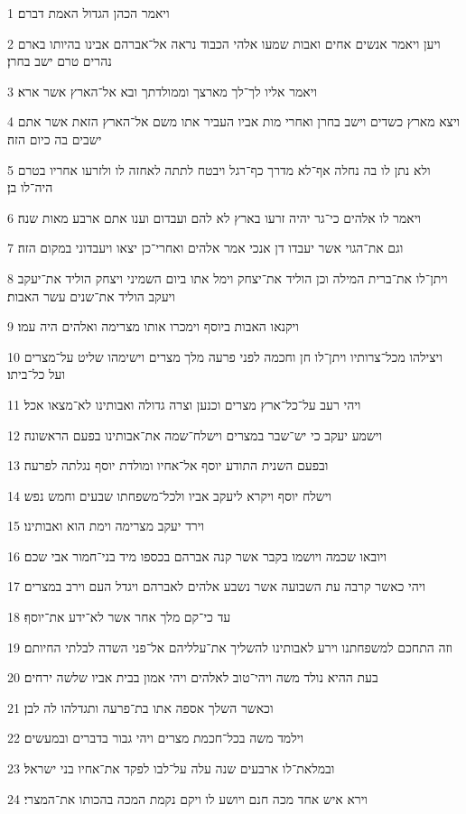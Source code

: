 \par 1 ויאמר הכהן הגדול האמת דברם׃
\par 2 ויען ויאמר אנשים אחים ואבות שמעו אלהי הכבוד נראה אל־אברהם אבינו בהיותו בארם נהרים טרם ישב בחרן׃
\par 3 ויאמר אליו לך־לך מארצך וממולדתך ובא אל־הארץ אשר ארא׃
\par 4 ויצא מארץ כשדים וישב בחרן ואחרי מות אביו העביר אתו משם אל־הארץ הזאת אשר אתם ישבים בה כיום הזה׃
\par 5 ולא נתן לו בה נחלה אף־לא מדרך כף־רגל ויבטח לתתה לאחזה לו ולזרעו אחריו בטרם היה־לו בן׃
\par 6 ויאמר לו אלהים כי־גר יהיה זרעו בארץ לא להם ועבדום וענו אתם ארבע מאות שנה׃
\par 7 וגם את־הגוי אשר יעבדו דן אנכי אמר אלהים ואחרי־כן יצאו ויעבדוני במקום הזה׃
\par 8 ויתן־לו את־ברית המילה וכן הוליד את־יצחק וימל אתו ביום השמיני ויצחק הוליד את־יעקב ויעקב הוליד את־שנים עשר האבות׃
\par 9 ויקנאו האבות ביוסף וימכרו אותו מצרימה ואלהים היה עמו׃
\par 10 ויצילהו מכל־צרותיו ויתן־לו חן וחכמה לפני פרעה מלך מצרים וישימהו שליט על־מצרים ועל כל־ביתו׃
\par 11 ויהי רעב על־כל־ארץ מצרים וכנען וצרה גדולה ואבותינו לא־מצאו אכל׃
\par 12 וישמע יעקב כי יש־שבר במצרים וישלח־שמה את־אבותינו בפעם הראשונה׃
\par 13 ובפעם השנית התודע יוסף אל־אחיו ומולדת יוסף נגלתה לפרעה׃
\par 14 וישלח יוסף ויקרא ליעקב אביו ולכל־משפחתו שבעים וחמש נפש׃
\par 15 וירד יעקב מצרימה וימת הוא ואבותינו׃
\par 16 ויובאו שכמה ויושמו בקבר אשר קנה אברהם בכספו מיד בני־חמור אבי שכם׃
\par 17 ויהי כאשר קרבה עת השבועה אשר נשבע אלהים לאברהם ויגדל העם וירב במצרים׃
\par 18 עד כי־קם מלך אחר אשר לא־ידע את־יוסף׃
\par 19 וזה התחכם למשפחתנו וירע לאבותינו להשליך את־עלליהם אל־פני השדה לבלתי החיותם׃
\par 20 בעת ההיא נולד משה ויהי־טוב לאלהים ויהי אמון בבית אביו שלשה ירחים׃
\par 21 וכאשר השלך אספה אתו בת־פרעה ותגדלהו לה לבן׃
\par 22 וילמד משה בכל־חכמת מצרים ויהי גבור בדברים ובמעשים׃
\par 23 ובמלאת־לו ארבעים שנה עלה על־לבו לפקד את־אחיו בני ישראל׃
\par 24 וירא איש אחד מכה חנם ויושע לו ויקם נקמת המכה בהכותו את־המצרי׃
